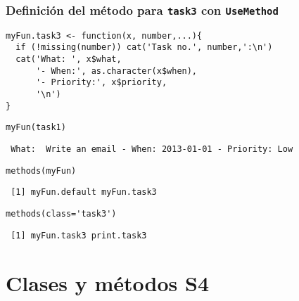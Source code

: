 \documentclass[xcolor={usenames,svgnames,dvipsnames}]{beamer}
\begin{document}
\begin{frame}[fragile]
\frametitle{Definición del método para \texttt{task3} con \texttt{UseMethod}}
\label{sec-2-3-3}


\lstset{language=R}
\begin{lstlisting}
myFun.task3 <- function(x, number,...){
  if (!missing(number)) cat('Task no.', number,':\n')
  cat('What: ', x$what,
      '- When:', as.character(x$when),
      '- Priority:', x$priority,
      '\n')
}
\end{lstlisting}



\lstset{language=R}
\begin{lstlisting}
myFun(task1)
\end{lstlisting}

\begin{verbatim}
 What:  Write an email - When: 2013-01-01 - Priority: Low
\end{verbatim}


\lstset{language=R}
\begin{lstlisting}
methods(myFun)
\end{lstlisting}

\begin{verbatim}
 [1] myFun.default myFun.task3
\end{verbatim}


\lstset{language=R}
\begin{lstlisting}
methods(class='task3')
\end{lstlisting}

\begin{verbatim}
 [1] myFun.task3 print.task3
\end{verbatim}
\end{frame}
\section{Clases y métodos S4}
\label{sec-3}
\end{document}
